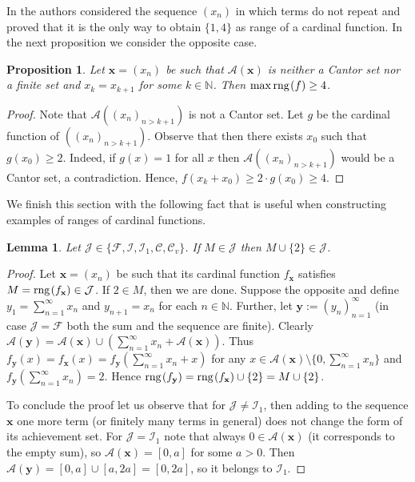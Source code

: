 \documentclass{amsart}
\newtheorem{lemma}[theorem]{Lemma}
\newtheorem{proposition}[theorem]{Proposition}
\theoremstyle{definition}
\newcommand{\rng}{{\rm rng} \hspace{0.03cm}}
\newcommand{\Cv}{\mathcal{C}_{v}}
\begin{document}
In \cite[Proposition 4.20]{cardfun} the authors considered the sequence $(x_n)$ in which terms do not repeat and proved that it is the only way to obtain $\{1,4\}$ as range of a cardinal function. In the next proposition we consider the opposite case.

\begin{proposition}\label{powtorzonywyraz}
Let $\mathbf{x}=(x_n)$ be such that $\mathcal{A}(\mathbf{x})$ is neither a Cantor set nor a finite set and $x_k=x_{k+1}$ for some $k\in\mathbb{N}$. Then $\max \rng(f)\geq 4$.
\end{proposition}
\begin{proof}
Note that $\mathcal{A}((x_n)_{n>k+1})$ is not a Cantor set. Let $g$ be the cardinal function of $((x_n)_{n>k+1})$. Observe that then there exists $x_{0}$ such that $g(x_{0})\geq 2$. Indeed, if $g(x)=1$ for all $x$ then $\mathcal{A}((x_n)_{n>k+1})$ would be a Cantor set, a contradiction. Hence, $f(x_k+x_{0})\geq 2\cdot g(x_{0})\geq 4$.
\end{proof}


We finish this section with the following fact that is useful when constructing examples of ranges of cardinal functions.

\begin{lemma}
Let $\mathcal{J}\in\{\mathcal{F},\mathcal{I}, \mathcal{I}_{1},\mathcal{C},\Cv\}$. If $M\in \mathcal{J}$ then $M\cup\{2\}\in \mathcal{J}$. 

\end{lemma}
\begin{proof}
Let $\textbf{x}=(x_n)$ be such that its cardinal function $f_{\textbf{x}}$ satisfies $M=\rng(f_{\textbf{x}})\in\mathcal{J}$. If $2\in M$, then we are done. Suppose the opposite and define $y_1=\sum_{n=1}^{\infty}x_n$ and $y_{n+1}=x_n$ for each $n\in\mathbb{N}$. Further, let $\textbf{y}:=(y_{n})_{n=1}^{\infty}$ (in case $\mathcal{J}=\mathcal{F}$ both the sum and the sequence are finite). Clearly $\mathcal{A}(\textbf{y})=\mathcal{A}(\textbf{x})\cup (\sum_{n=1}^{\infty}x_n+\mathcal{A}(\textbf{x}))$. Thus $f_{\textbf{y}}(x)=f_{\textbf{x}}(x)=f_{\textbf{y}}(\sum_{n=1}^{\infty}x_n+x)$ for any $x\in \mathcal{A}(\textbf{x})\setminus\{0,\sum_{n=1}^{\infty}x_n\}$  and $f_{\textbf{y}}(\sum_{n=1}^{\infty}x_n)=2$. Hence $\rng(f_{\textbf{y}})=\rng(f_{\textbf{x}})\cup\{2\}=M\cup\{2\}$. 

To conclude the proof let us observe that for $\mathcal{J}\neq\mathcal{I}_{1}$, then adding to the sequence $\textbf{x}$ one more term (or finitely many terms in general) does not change the form of its achievement set. For $\mathcal{J}=\mathcal{I}_{1}$ note that always $0\in \mathcal{A}(\mathbf{x})$ (it corresponds to the empty sum), so $\mathcal{A}(\mathbf{x})=[0,a]$ for some $a>0$. Then $\mathcal{A}(\mathbf{y})=[0,a]\cup [a,2a]=[0,2a]$, so it belongs to $\mathcal{I}_{1}$. %
\end{proof}
\end{document}
